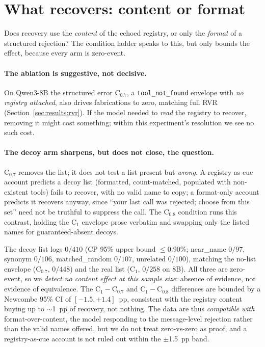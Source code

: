 \section{What recovers: content or format}
\label{sec:mechanism}

Does recovery use the \emph{content} of the echoed registry, or only the
\emph{format} of a structured rejection? The condition ladder speaks to
this, but only bounds the effect, because every arm is zero-event.

\paragraph{The ablation is suggestive, not decisive.}
On Qwen3-8B the structured error $\mathrm{C}_{0.7}$, a
\texttt{tool\_not\_found} envelope with \emph{no registry attached}, also
drives fabrications to zero, matching full RVR
(Section~\ref{sec:results:rvr}). If the model needed to \emph{read} the
registry to recover, removing it might cost something; within this
experiment's resolution we see no such cost.

\paragraph{The decoy arm sharpens, but does not close, the question.}
$\mathrm{C}_{0.7}$ removes the list; it does not test a list present but
\emph{wrong}. A registry-as-cue account predicts a decoy list (formatted,
count-matched, populated with non-existent tools) fails to recover, with
no valid name to copy; a format-only account predicts it recovers anyway,
since ``your last call was rejected; choose from this set'' need not be
truthful to suppress the call. The $\mathrm{C}_{0.8}$ condition runs this
contrast, holding the $\mathrm{C}_1$ envelope prose verbatim and swapping
only the listed names for guaranteed-absent decoys.

The decoy list logs $0/410$ (CP 95\% upper bound $\leq\!0.90\%$;
near\_name $0/97$, synonym $0/106$, matched\_random $0/107$, unrelated
$0/100$), matching the no-list envelope ($\mathrm{C}_{0.7}$, $0/448$) and
the real list ($\mathrm{C}_1$, $0/258$ on 8B). All three are zero-event,
so we \emph{detect no content effect at this sample size}: absence of
evidence, not evidence of equivalence. The
$\mathrm{C}_1\!-\!\mathrm{C}_{0.7}$ and $\mathrm{C}_1\!-\!\mathrm{C}_{0.8}$
differences are bounded by a Newcombe 95\% CI of $[-1.5, +1.4]$~pp,
consistent with the registry content buying up to $\sim$1~pp of recovery,
not nothing. The data are thus \emph{compatible with} format-over-content,
the model responding to the message-level rejection rather than the valid
names offered, but we do not treat zero-vs-zero as proof, and a
registry-as-cue account is not ruled out within the $\pm$1.5~pp band.

